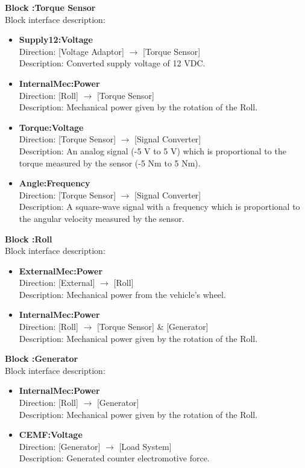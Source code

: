 \textbf{Block :Torque Sensor}\\
Block interface description:
\begin{itemize}
	\item \textbf{Supply12:Voltage}\\
	Direction: [Voltage Adaptor] $\rightarrow$ [Torque Sensor]\\
	Description: Converted supply voltage of 12 VDC.
	\item \textbf{InternalMec:Power}\\
	Direction: [Roll] $\rightarrow$ [Torque Sensor]\\
	Description: Mechanical power given by the rotation of the Roll.
	\item \textbf{Torque:Voltage}\\
	Direction: [Torque Sensor] $\rightarrow$ [Signal Converter]\\
	Description: An analog signal (-5 V to 5 V) which is proportional to the torque measured by the sensor (-5 Nm to 5 Nm).
	\item \textbf{Angle:Frequency}\\
	Direction: [Torque Sensor] $\rightarrow$ [Signal Converter]\\
	Description: A square-wave signal with a frequency which is proportional to the angular velocity measured by the sensor.
\end{itemize}


\textbf{Block :Roll}\\
Block interface description:
\begin{itemize}
	\item \textbf{ExternalMec:Power}\\
	Direction: [External] $\rightarrow$ [Roll]\\
	Description: Mechanical power from the vehicle's wheel.
	\item \textbf{InternalMec:Power}\\
	Direction: [Roll] $\rightarrow$ [Torque Sensor] \& [Generator]\\
	Description: Mechanical power given by the rotation of the Roll.
\end{itemize}

\textbf{Block :Generator}\\
Block interface description:
\begin{itemize}
	\item \textbf{InternalMec:Power}\\
	Direction: [Roll] $\rightarrow$ [Generator]\\
	Description: Mechanical power given by the rotation of the Roll.
	\item \textbf{CEMF:Voltage}\\
	Direction: [Generator] $\rightarrow$ [Load System]\\
	Description: Generated counter electromotive force.
\end{itemize}


